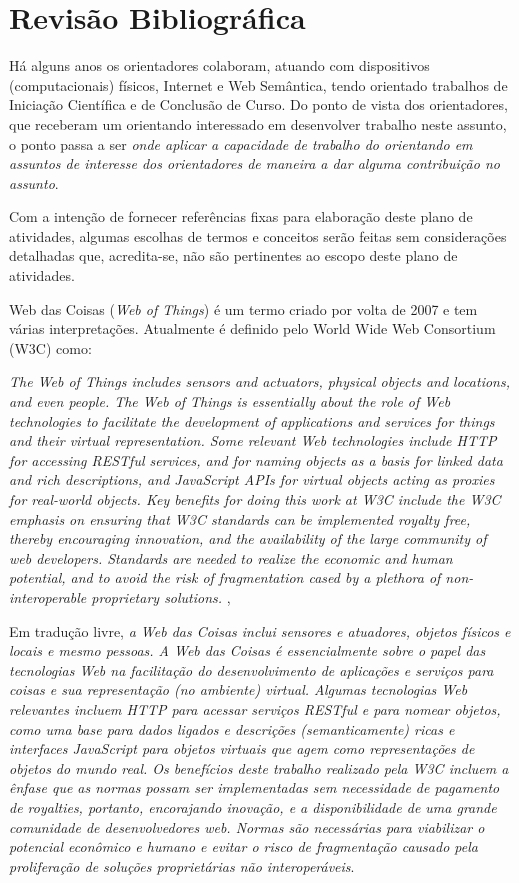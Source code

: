 \chapter{Revisão Bibliográfica}

Há alguns anos os orientadores colaboram, atuando com dispositivos (computacionais) físicos, Internet e Web Semântica, tendo orientado trabalhos de Iniciação Científica e de Conclusão de Curso. Do ponto de vista dos orientadores, que receberam um orientando interessado em desenvolver trabalho neste assunto, o ponto passa a ser \textit{onde aplicar a capacidade de trabalho do orientando em assuntos de interesse dos orientadores de maneira a dar alguma contribuição no assunto}. 

Com a intenção de fornecer referências fixas para elaboração deste plano de atividades, algumas escolhas de termos e conceitos serão feitas sem considerações detalhadas que, acredita-se, não são pertinentes ao escopo deste plano de atividades.

Web das Coisas (\textit{Web of Things}) é um termo criado por volta de 2007 e tem várias interpretações. Atualmente é definido pelo World Wide Web Consortium (W3C) como:

\textit{The Web of Things includes sensors and actuators, physical objects and locations, and even people. The Web of Things is essentially about the role of Web technologies to facilitate the development of applications and services for things and their virtual representation. Some relevant Web technologies include HTTP for accessing RESTful services, and for naming objects as a basis for linked data and rich descriptions, and JavaScript APIs for virtual objects acting as proxies for real-world objects. Key benefits for doing this work at W3C include the W3C emphasis on ensuring that W3C standards can be implemented royalty free, thereby encouraging innovation, and the availability of the large community of web developers. Standards are needed to realize the economic and human potential, and to avoid the risk of fragmentation cased by a plethora of non-interoperable proprietary solutions.
} \cite{WoTTerminology}, \cite{WoTCommunityWiki}

Em tradução livre, \textit{a Web das Coisas inclui sensores e atuadores, objetos físicos e locais e mesmo pessoas. A Web das Coisas é essencialmente sobre o papel das tecnologias Web na facilitação do desenvolvimento de aplicações e serviços para coisas e sua representação (no ambiente) virtual. Algumas tecnologias Web relevantes incluem HTTP para acessar serviços RESTful e para nomear objetos, como uma base para dados ligados e descrições (semanticamente) ricas e interfaces JavaScript para objetos virtuais que agem como representações de objetos do mundo real. Os benefícios deste trabalho realizado pela W3C incluem a ênfase que as normas possam ser implementadas sem necessidade de pagamento de royalties, portanto, encorajando inovação, e a disponibilidade de uma grande comunidade de desenvolvedores web. Normas são necessárias para viabilizar o potencial econômico e humano e evitar o risco de fragmentação causado pela proliferação de soluções proprietárias não interoperáveis}.

